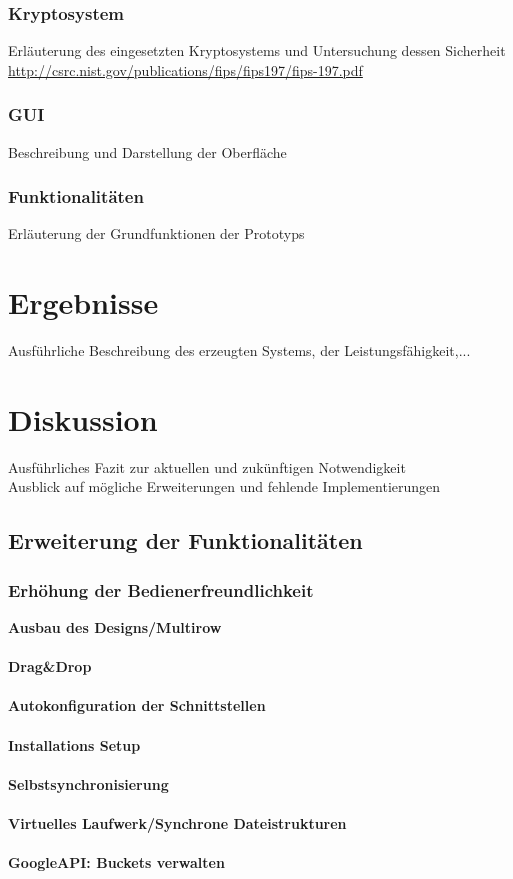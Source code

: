 \documentclass[12pt,a4paper,bibliography=totocnumbered,listof=totocnumbered]{scrartcl}
\begin{document}
 
\subsubsection{Kryptosystem}
Erläuterung des eingesetzten Kryptosystems und Untersuchung dessen Sicherheit\\
\url{http://csrc.nist.gov/publications/fips/fips197/fips-197.pdf}
\subsubsection{GUI}
Beschreibung und Darstellung der Oberfläche
\subsubsection{Funktionalitäten}
Erläuterung der Grundfunktionen der Prototyps

\pagebreak

\section{Ergebnisse}
Ausführliche Beschreibung des erzeugten Systems, der Leistungsfähigkeit,...

\pagebreak

\section{Diskussion}
Ausführliches Fazit zur aktuellen und zukünftigen Notwendigkeit\\
Ausblick auf mögliche Erweiterungen und fehlende Implementierungen


\subsection{Erweiterung der Funktionalitäten}
\subsubsection{Erhöhung der Bedienerfreundlichkeit}
\textbf{Ausbau des Designs/Multirow}\\
\\\textbf{Drag\&Drop}\\
\\\textbf{Autokonfiguration der Schnittstellen}\\
\\\textbf{Installations Setup}\\
\\\textbf{Selbstsynchronisierung}\\
\\\textbf{Virtuelles Laufwerk/Synchrone Dateistrukturen}\\
\\\textbf{GoogleAPI: Buckets verwalten}\\
\end{document}
